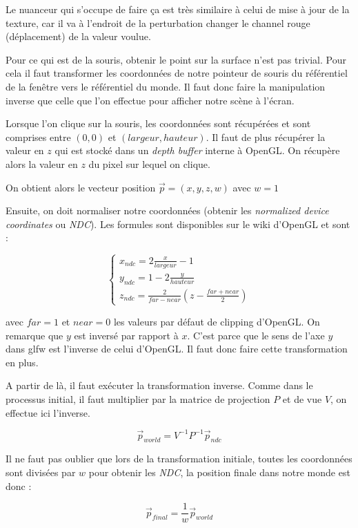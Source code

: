 \documentclass[a4paper,11pt,leqno]{article}
\begin{document}
Le nuanceur qui s'occupe de faire ça est très similaire à celui de mise à jour de la texture, car il va à l'endroit de la perturbation changer le channel rouge (déplacement) de la valeur voulue.

Pour ce qui est de la souris, obtenir le point sur la surface n'est pas trivial. Pour cela il faut transformer les coordonnées de notre pointeur de souris du référentiel de la fenêtre vers le référentiel du monde. Il faut donc faire la manipulation inverse que celle que l'on effectue pour afficher notre scène à l'écran.

Lorsque l'on clique sur la souris, les coordonnées sont récupérées et sont comprises entre $(0, 0)$ et $(largeur, hauteur)$. Il faut de plus récupérer la valeur en $z$ qui est stocké dans un \emph{depth buffer} interne à OpenGL. On récupère alors la valeur en $z$ du pixel sur lequel on clique.

On obtient alors le vecteur position $\overrightarrow{p} = (x,y,z,w)$ avec $w=1$

Ensuite, on doit normaliser notre coordonnées (obtenir les \emph{normalized device coordinates} ou \emph{NDC}). Les formules sont disponibles sur le wiki d'OpenGL et sont :

\[
\begin{cases}
	x_{ndc} = 2\frac{x}{largeur} - 1\\
	y_{ndc} = 1 - 2 \frac{y}{hauteur}\\
	z_{ndc} = \frac{2}{far - near}( z - \frac{far + near}{2})
\end{cases}
\]

avec $far = 1$ et $near = 0$ les valeurs par défaut de clipping d'OpenGL. On remarque que $y$ est inversé par rapport à $x$. C'est parce que le sens de l'axe $y$ dans glfw est l'inverse de celui d'OpenGL. Il faut donc faire cette transformation en plus.

A partir de là, il faut exécuter la transformation inverse. Comme dans le processus initial, il faut multiplier par la matrice de projection $P$ et de vue $V$, on effectue ici l'inverse.

\[
	\overrightarrow{p}_{world} = V^{-1}P^{-1} \overrightarrow{p}_{ndc}
\]

Il ne faut pas oublier que lors de la transformation initiale, toutes les coordonnées sont divisées par $w$ pour obtenir les \emph{NDC}, la position finale dans notre monde est donc :

\[
	\overrightarrow{p}_{final} = \frac{1}{w} \overrightarrow{p}_{world}
\]
\end{document}
